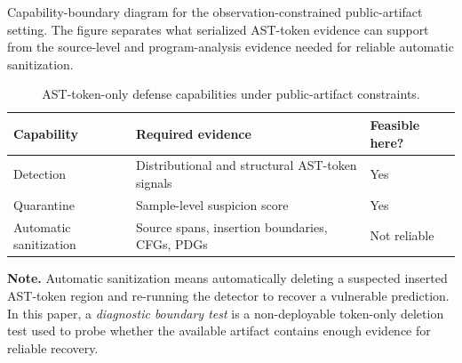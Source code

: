 \documentclass[letterpaper,twocolumn,10pt,twoside]{article}
\begin{document}
\begin{center}
  \captionsetup{type=figure}
  \centering
  \setlength{\fboxsep}{5pt}
  \caption{Capability-boundary diagram for the observation-constrained public-artifact setting. The figure separates what serialized AST-token evidence can support from the source-level and program-analysis evidence needed for reliable automatic sanitization.}
  \label{fig:attack-defense-example}
\end{center}

\begin{table}[tbp]
\centering
\caption{AST-token-only defense capabilities under public-artifact constraints.}
\label{tab:capability-boundary}
\scriptsize
\setlength{\tabcolsep}{2.5pt}
\begin{tabular}{L{2.1cm}L{3.2cm}L{1.6cm}}
\toprule
Capability & Required evidence & Feasible here? \\
\midrule
Detection & Distributional and structural AST-token signals & Yes \\
Quarantine & Sample-level suspicion score & Yes \\
Automatic sanitization & Source spans, insertion boundaries, CFGs, PDGs & Not reliable \\
\bottomrule
\end{tabular}
\vspace{2pt}
\par\footnotesize\textbf{Note.} Automatic sanitization means automatically deleting a suspected inserted AST-token region and re-running the detector to recover a vulnerable prediction. In this paper, a \textit{diagnostic boundary test} is a non-deployable token-only deletion test used to probe whether the available artifact contains enough evidence for reliable recovery.
\end{table}
\end{document}
